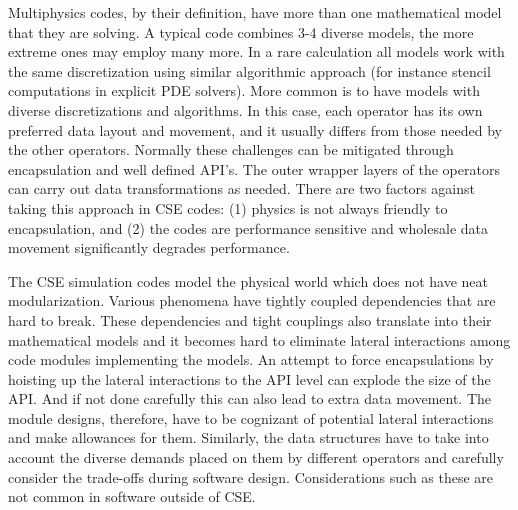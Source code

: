 \label{sec:domainChallenges}
Multiphysics codes, by their definition, have more than one
mathematical model that they are solving. A typical code combines 3-4
diverse models, the more extreme ones may employ many more.
In a rare calculation all models work with the same
discretization using similar algorithmic approach (for instance
stencil computations in explicit PDE solvers). More common is to have
models with diverse discretizations and algorithms. In this case, each operator has
its own preferred data layout and movement, and it usually differs
from those needed by the other operators.  Normally these challenges
can be mitigated through encapsulation and well defined API's. The outer
wrapper layers of the operators can carry out data transformations as
needed. There are two factors against taking this approach in CSE
codes: (1) physics is not always friendly to encapsulation, and (2)
the codes are performance sensitive and wholesale data movement
significantly degrades performance. 

The CSE simulation codes model the physical world which does not
have neat modularization. Various phenomena have tightly coupled
dependencies that are hard to break. These dependencies and tight
couplings also translate into their mathematical models and it becomes
hard to eliminate lateral interactions among code modules implementing
the models. An attempt to force encapsulations by hoisting up the
lateral interactions to the API level can explode the size of the
API. And if not done carefully this can also lead to extra data
movement. The module designs, therefore, have to be cognizant of
potential lateral interactions and make allowances for them.
Similarly, the data structures have to take into account the diverse
demands placed on them by different operators and carefully consider
the trade-offs during software design. Considerations such as these
are not common in software outside of CSE.  


